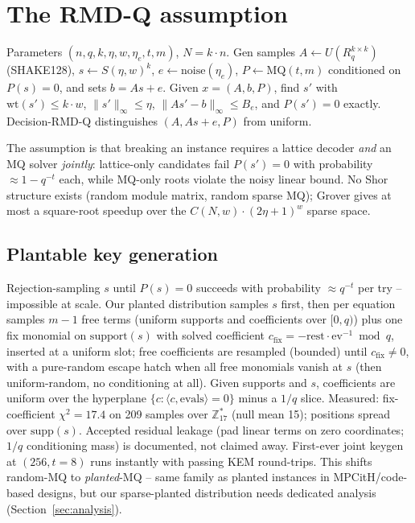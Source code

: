 \section{The RMD-Q assumption}
\label{sec:problem}

\begin{definition}
Parameters $(n,q,k,\eta,w,\eta_e,t,m)$, $N=k{\cdot}n$.
\textsf{Gen} samples $A \gets U(R_q^{k\times k})$ (SHAKE128),
$s \gets S(\eta,w)^k$, $e \gets \mathrm{noise}(\eta_e)$,
$P \gets \mathrm{MQ}(t,m)$ conditioned on $P(s)=0$, and sets $b = As+e$.
Given $x=(A,b,P)$, find $s'$ with $\mathrm{wt}(s')\le k{\cdot}w$,
$\|s'\|_\infty \le \eta$, $\|As'-b\|_\infty \le B_e$, and $P(s')=0$
exactly. Decision-RMD-Q distinguishes $(A,As+e,P)$ from uniform.
\end{definition}

The assumption is that breaking an instance requires a lattice decoder
\emph{and} an MQ solver \emph{jointly}: lattice-only candidates fail
$P(s')=0$ with probability $\approx 1-q^{-t}$ each, while MQ-only roots
violate the noisy linear bound. No Shor structure exists (random module
matrix, random sparse MQ); Grover gives at most a square-root speedup over
the $C(N,w)\cdot(2\eta+1)^w$ sparse space.

\subsection{Plantable key generation}

Rejection-sampling $s$ until $P(s)=0$ succeeds with probability $\approx
q^{-t}$ per try -- impossible at scale. Our planted distribution samples
$s$ first, then per equation samples $m{-}1$ free terms (uniform supports
and coefficients over $[0,q)$) plus one fix monomial on
$\mathrm{support}(s)$ with solved coefficient
$c_{\mathrm{fix}} = -\mathrm{rest}\cdot \mathrm{ev}^{-1} \bmod q$, inserted
at a uniform slot; free coefficients are resampled (bounded) until
$c_{\mathrm{fix}}\ne 0$, with a pure-random escape hatch when all free
monomials vanish at $s$ (then uniform-random, no conditioning at all).
Given supports and $s$, coefficients are uniform over the hyperplane
$\{c : \langle c,\mathrm{evals}\rangle = 0\}$ minus a $1/q$ slice.
Measured: fix-coefficient $\chi^2 = 17.4$ on 209 samples over
$\mathbb{Z}_{17}^*$ (null mean 15); positions spread over $\mathrm{supp}(s)$.
Accepted residual leakage (pad linear terms on zero coordinates;
$1/q$ conditioning mass) is documented, not claimed away. First-ever joint
keygen at $(256, t{=}8)$ runs instantly with passing KEM round-trips.
This shifts random-MQ to \emph{planted}-MQ -- same family as planted
instances in MPCitH/code-based designs, but our sparse-planted distribution
needs dedicated analysis (Section~\ref{sec:analysis}).

